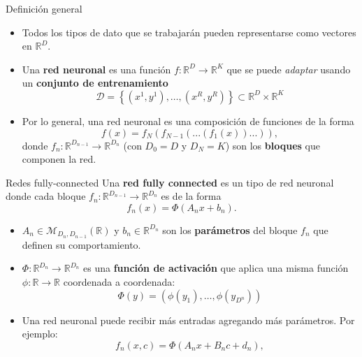 \documentclass{beamer}
\newcommand{\R}{\mathbb{R}}
\begin{document}
\begin{frame}{Definición general}
    \begin{itemize}
        \item Todos los tipos de dato que se trabajarán pueden representarse como vectores en $\R^D$.
        \item Una \textbf{red neuronal} es una función $f:\R^D\to\R^K$ que se puede \textit{adaptar} usando un \textbf{conjunto de entrenamiento}
              \begin{equation*}
                  \mathcal{D}=\left\{(x^1,y^1),\ldots,(x^R,y^R)\right\}\subset\R^D\times\R^K
              \end{equation*}
        \item Por lo general, una red neuronal es una composición de funciones de la forma
              \begin{equation*}
                  f(x)=f_N(f_{N-1}(...(f_1(x))...)),
              \end{equation*}
              donde $f_n:\R^{D_{n-1}}\to\R^{D_n}$ (con $D_0=D$ y $D_N=K$) son los \textbf{bloques} que componen la red.
    \end{itemize}
\end{frame}



\begin{frame}{Redes fully-connected}
    Una \textbf{red fully connected} es un tipo de red neuronal donde cada bloque $f_n:\R^{D_{n-1}}\to\R^{D_n}$ es de la forma
    \begin{equation*}
        f_n(x)=\Phi(A_nx+b_n).
    \end{equation*}
    \begin{itemize}
        \item $A_n\in\mathcal{M}_{D_n,D_{n-1}}(\R)$ y $b_n\in\R^{D_n}$ son los \textbf{parámetros} del bloque $f_n$ que definen su comportamiento.
        \item $\Phi:\R^{D_n}\to\R^{D_n}$ es una \textbf{función de activación} que aplica una misma función $\phi:\R\to\R$ coordenada a coordenada:
              \begin{equation*}
                  \Phi(y)=\left(\phi(y_1),\ldots,\phi(y_{D^n})\right)
              \end{equation*}
        \item Una red neuronal puede recibir más entradas agregando más parámetros. Por ejemplo:
              \begin{equation*}
                  f_n(x,c)=\Phi(A_nx+B_nc+d_n),
              \end{equation*}
    \end{itemize}
\end{frame}
\end{document}
